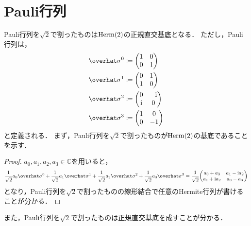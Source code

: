 \documentclass{report}
\begin{document}
  \section{Pauli行列}
    Pauli行列を$\sqrt{2}$で割ったものは$\rm{Herm}(2)$の正規直交基底となる．
    ただし，Pauli行列は，
    \begin{align}
      \hat{\sigma}^0 &\coloneqq \mqty(1 & 0 \\ 0 & 1) \\ 
      \hat{\sigma}^1 &\coloneqq \mqty(0 & 1 \\ 1 & 0) \\ 
      \hat{\sigma}^2 &\coloneqq \mqty(0 & -\i \\ \i & 0) \\ 
      \hat{\sigma}^3 &\coloneqq \mqty(1 & 0 \\ 0 & -1)
    \end{align}
    と定義される．
    まず，Pauli行列を$\sqrt{2}$で割ったものが$\mathrm{Herm}(2)$の基底であることを示す．
    \begin{proof}
      $a_0, a_1, a_2, a_3 \in \mathbb{C}$を用いると，
      \begin{align}
        \frac{1}{\sqrt{2}}a_0\hat{\sigma}^0 + \frac{1}{\sqrt{2}}a_1\hat{\sigma}^1 + \frac{1}{\sqrt{2}}a_2\hat{\sigma}^2 + \frac{1}{\sqrt{2}}a_3\hat{\sigma}^3 = \frac{1}{\sqrt{2}}\mqty(a_0 + a_3 & a_1 - \i a_2 \\ a_1 + \i a_2 & a_0 - a_3) 
      \end{align}
      となり，Pauli行列を$\sqrt{2}$で割ったものの線形結合で任意のHermite行列が書けることが分かる．
    \end{proof}
    \par
    また，Pauli行列を$\sqrt{2}$で割ったものは正規直交基底を成すことが分かる．
\end{document}
